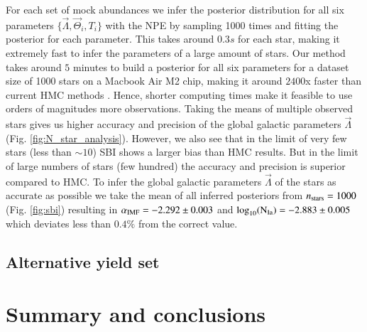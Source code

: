 \documentclass{aa}
\begin{document}
For each set of mock abundances we infer the posterior distribution for all six parameters $\{\vec\Lambda,\vec\Theta_i,T_i\}$ with the NPE by sampling 1000 times and fitting the posterior for each parameter. This takes around $0.3s$ for each star, making it extremely fast to infer the parameters of a large amount of stars. 
Our method takes around $5$ minutes to build a posterior for all six parameters for a dataset size of 1000 stars on a Macbook Air M2 chip, making it around $2400$x faster than current HMC methods \citep[cf.][who needs $40$h for 200 stars with HMC]{Philcox_2019}. Hence, shorter computing times make it feasible to use orders of magnitudes more observations.
%
Taking the means of multiple observed stars gives us higher accuracy and precision of the global galactic parameters $\vec\Lambda$ (Fig. \ref{fig:N_star_analysis}). However, we also see that in the limit of very few stars (less than $\sim10$) SBI shows a larger bias than HMC results. But in the limit of large numbers of stars (few hundred) the accuracy and precision is superior compared to HMC.
%
To infer the global galactic parameters $\vec\Lambda$ of the stars as accurate as possible we take the mean of all inferred posteriors from $n_{\rm stars}=1000$ (Fig. \ref{fig:sbi}) resulting in $\alpha_{\rm IMF}=-2.292\pm0.003$ and $\log_{10}(\rm N_{Ia})=-2.883\pm0.005$ which deviates less than $0.4\%$ from the correct value.


\subsection{Alternative yield set}
\label{subsec: mocks_wrong_yield}

\section{Summary and conclusions}
\label{sec: conclusion}
\end{document}
